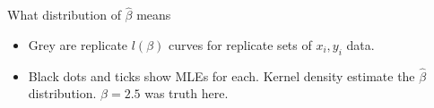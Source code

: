 \documentclass{beamer}
\newcommand{\eps}[3]
{{\begin{center}
 \rotatebox{#1}{\scalebox{#2}{\texttt{[image: \#3]}}}
 \end{center}}
}
\begin{document}
\begin{frame}{What distribution of $\hat \beta$ means}
\begin{itemize}
\item Grey are replicate $l(\beta)$ curves for replicate sets of $x_i, y_i$ data.
\item Black dots and ticks show MLEs for each. Kernel density estimate the $\hat \beta$ distribution. $\beta=2.5 $ was truth here.
\end{itemize}
\vspace*{-1cm}

\eps{0}{.5}{fig-beta-dist-1.pdf}
\end{frame}
\end{document}
